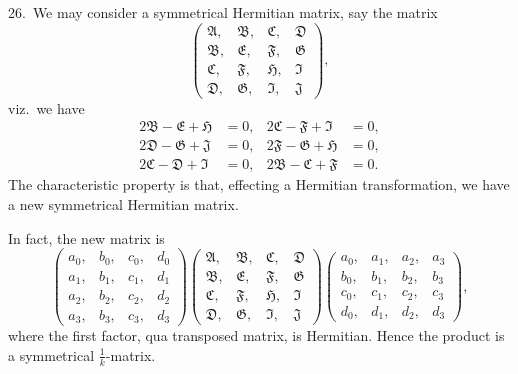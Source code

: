 \documentclass[11pt,a4paper]{article}
\theoremstyle{definition}
\begin{document}
26.\ We may consider a symmetrical Hermitian matrix, say the matrix
\[
\begin{pmatrix}
\mathfrak{A}, & \mathfrak{B}, & \mathfrak{C}, & \mathfrak{D}\\
\mathfrak{B}, & \mathfrak{E}, & \mathfrak{F}, & \mathfrak{G}\\
\mathfrak{C}, & \mathfrak{F}, & \mathfrak{H}, & \mathfrak{I}\\
\mathfrak{D}, & \mathfrak{G}, & \mathfrak{I}, & \mathfrak{J}
\end{pmatrix},
\]
viz.\ we have
\begin{align*}
2\mathfrak{B} - \mathfrak{E} + \mathfrak{H} &= 0, & 2\mathfrak{C} - \mathfrak{F} + \mathfrak{I} &= 0,\\
2\mathfrak{D} - \mathfrak{G} + \mathfrak{J} &= 0, & 2\mathfrak{F} - \mathfrak{G} + \mathfrak{H} &= 0,\\
2\mathfrak{C} - \mathfrak{D} + \mathfrak{I} &= 0, & 2\mathfrak{B} - \mathfrak{C} + \mathfrak{F} &= 0.
\end{align*}
The characteristic property is that, effecting a Hermitian transformation, we have a new symmetrical Hermitian matrix.

In fact, the new matrix is
\[
\begin{pmatrix}
a_0, & b_0, & c_0, & d_0\\
a_1, & b_1, & c_1, & d_1\\
a_2, & b_2, & c_2, & d_2\\
a_3, & b_3, & c_3, & d_3
\end{pmatrix}
\begin{pmatrix}
\mathfrak{A}, & \mathfrak{B}, & \mathfrak{C}, & \mathfrak{D}\\
\mathfrak{B}, & \mathfrak{E}, & \mathfrak{F}, & \mathfrak{G}\\
\mathfrak{C}, & \mathfrak{F}, & \mathfrak{H}, & \mathfrak{I}\\
\mathfrak{D}, & \mathfrak{G}, & \mathfrak{I}, & \mathfrak{J}
\end{pmatrix}
\begin{pmatrix}
a_0, & a_1, & a_2, & a_3\\
b_0, & b_1, & b_2, & b_3\\
c_0, & c_1, & c_2, & c_3\\
d_0, & d_1, & d_2, & d_3
\end{pmatrix},
\]
where the first factor, qua transposed matrix, is Hermitian. Hence the product is a symmetrical $\frac{1}{k}$-matrix.

\medskip
\end{document}
